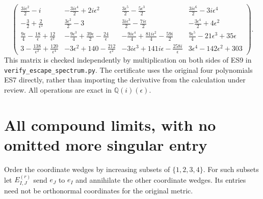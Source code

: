 \documentclass[11pt]{article}
\begin{document}
\[
\begin{pmatrix}
 \frac{3i\epsilon^2}{2}-i&-\frac{3i\epsilon^4}{2}+2i\epsilon^2&
 \frac{3\epsilon^5}{2}-\frac{5\epsilon^3}{2}&\frac{3i\epsilon^6}{2}-3i\epsilon^4\\
 -\frac32+\frac2{\epsilon^2}&\frac{3\epsilon^2}{2}-3&
 \frac{3i\epsilon^3}{2}-\frac{7i\epsilon}{2}&-\frac{3\epsilon^4}{2}+4\epsilon^2\\
 \frac{9\epsilon}{4}-\frac{18}{\epsilon}+\frac{12}{\epsilon^3}&
 -\frac{9\epsilon^3}{4}+\frac{39\epsilon}{2}-\frac{24}{\epsilon}&
 -\frac{9i\epsilon^4}{4}+\frac{81i\epsilon^2}{4}-\frac{59i}{2}&
 \frac{9\epsilon^5}{4}-21\epsilon^3+35\epsilon\\
 3-\frac{138}{\epsilon^2}+\frac{120}{\epsilon^4}&
 -3\epsilon^2+140-\frac{212}{\epsilon^2}&
 -3i\epsilon^3+141i\epsilon-\frac{258i}{\epsilon}&
 3\epsilon^4-142\epsilon^2+303
\end{pmatrix}.
\tag{ES10}
\]
This matrix is checked independently by multiplication on both
sides of ES9 in \texttt{verify\_escape\_spectrum.py}. The certificate
uses the original four polynomials ES7 directly, rather than importing
the derivative from the calculation under review. All operations are
exact in $\mathbb Q(i)(\epsilon)$.

\section{All compound limits, with no omitted more singular entry}
Order the coordinate wedges by increasing subsets of $\{1,2,3,4\}$.
For such subsets let $E_{I,J}^{(r)}$ send $e_J$ to $e_I$ and
annihilate the other coordinate wedges. Its entries need not be
orthonormal coordinates for the original metric.
\end{document}
